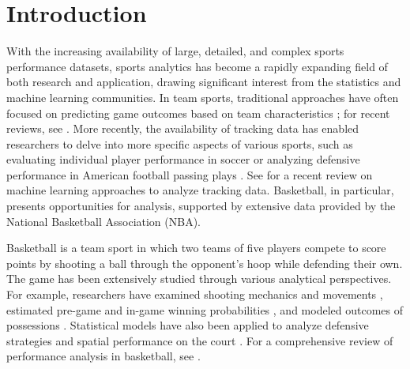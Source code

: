 \documentclass[USenglish]{article}
\theoremstyle{dgthm}
\theoremstyle{dgdef}
\begin{document}

\maketitle


\section{Introduction} %
\label{sec:introduction}

With the increasing availability of large, detailed, and complex sports performance datasets, sports analytics has become a rapidly expanding field of both research and application, drawing significant interest from the statistics and machine learning communities. In team sports, traditional approaches have often focused on predicting game outcomes based on team characteristics \citep{dixonModellingAssociationFootball1997,babootaPredictiveAnalysisModelling2019}; for recent reviews, see \cite{horvatUseMachineLearning2020,bunkerApplicationMachineLearning2022}.
More recently, the availability of tracking data has enabled researchers to delve into more specific aspects of various sports, such as evaluating individual player performance in soccer \citep{pappalardoPlayeRankDatadrivenPerformance2019,decroosActionsSpeakLouder2019} or analyzing defensive performance in American football passing plays \citep{schmidSimulatingDefensiveTrajectories2021}. See \cite{kovalchikPlayerTrackingData2023} for a recent review on machine learning approaches to analyze tracking data. Basketball, in particular, presents opportunities for analysis, supported by extensive data provided by the National Basketball Association (NBA).


Basketball is a team sport in which two teams of five players compete to score points by shooting a ball through the opponent's hoop while defending their own. The game has been extensively studied through various analytical perspectives. For example, researchers have examined shooting mechanics and movements \citep{millerRelationshipBasketballShooting1996,liuChangesBasketballShooting1999,okazakiReviewBasketballJump2015}, estimated pre-game and in-game winning probabilities \citep{maddoxBayesianEstimationIngame2022}, and modeled outcomes of possessions \citep{cervoneMultiresolutionStochasticProcess2016}. Statistical models have also been applied to analyze defensive strategies \citep{csataljayEffectsDefensivePressure2013} and spatial performance on the court \citep{zuccolottoSpatialPerformanceAnalysis2023}. For a comprehensive review of performance analysis in basketball, see \cite{ternerModelingPlayerTeam2021}.
\end{document}
